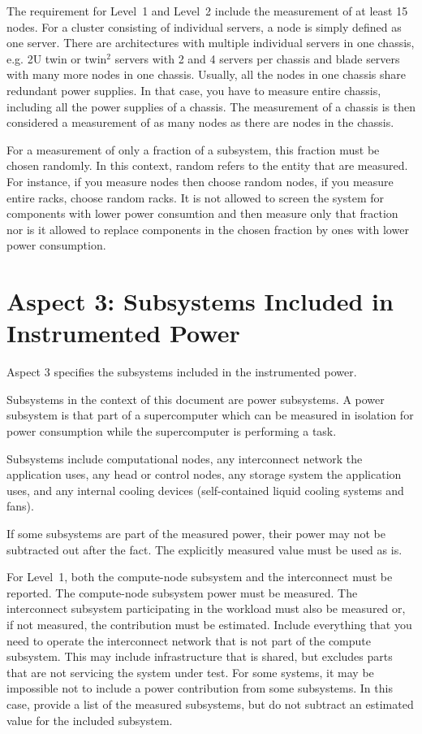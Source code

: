 \noindent
The requirement for Level~1 and Level~2 include the measurement of at least 15 nodes.
For a cluster consisting of individual servers, a node is simply defined as one server.
There are architectures with multiple individual servers in one chassis, e.g.
2U twin or twin$^2$ servers with 2 and 4 servers per chassis and blade servers with many more nodes in one chassis.
Usually, all the nodes in one chassis share redundant power supplies.
In that case, you have to measure entire chassis, including all the power supplies of a chassis.
The measurement of a chassis is then considered a measurement of as many nodes as there are nodes in the chassis.
\wl

\noindent
For a measurement of only a fraction of a subsystem, this fraction must be chosen randomly.
In this context, random refers to the entity that are measured.
For instance, if you measure nodes then choose random nodes, if you measure entire racks, choose random racks.
It is not allowed to screen the system for components with lower power consumtion and then measure only that fraction nor is it allowed to replace components in the chosen fraction by ones with lower power consumption.
\wl

\section{Aspect 3: Subsystems Included in Instrumented Power}
\label{sec:A3SIiIP}
\noindent
Aspect 3 specifies the subsystems included in the instrumented power.
\wl

\noindent
Subsystems in the context of this document are power subsystems.
A power subsystem is that part of a supercomputer which can be measured in isolation for power consumption while the supercomputer is performing a task.
\wl

\noindent
Subsystems include computational nodes, any interconnect network the application uses, any head or control nodes, any storage system the application uses, and any internal cooling devices (self-contained liquid cooling systems and fans).
\wl

\noindent
If some subsystems are part of the measured power, their power may not be subtracted out after the fact.
The explicitly measured value must be used as is.
\wl


\noindent
For Level~1, both the compute-node subsystem and the interconnect must be reported.
The compute-node subsystem power must be measured.
The interconnect subsystem participating in the workload must also be measured or, if not measured, the contribution must be estimated.
Include everything that you need to operate the interconnect network that is not part of the compute subsystem.
This may include infrastructure that is shared, but excludes parts that are not servicing the system under test.
For some systems, it may be impossible not to include a power contribution from some subsystems.
In this case, provide a list of the measured subsystems, but do not subtract an estimated value for the included subsystem.
\wl

